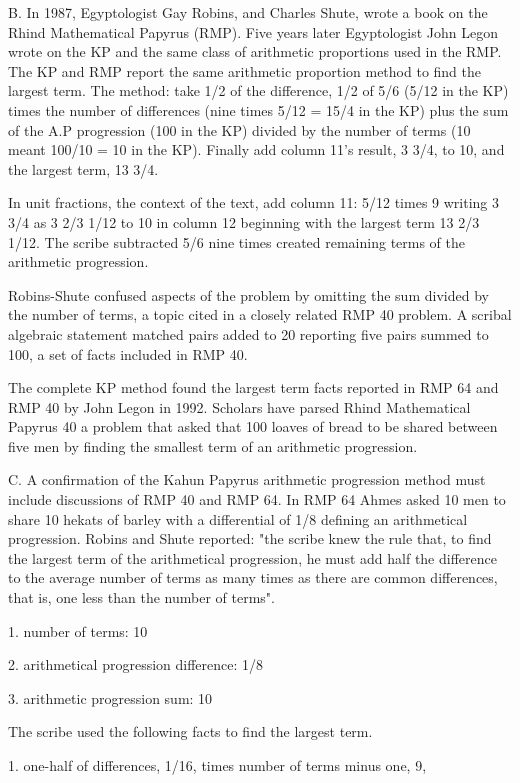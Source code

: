 \documentclass[12pt]{article}
\begin{document}
B. In 1987, Egyptologist Gay Robins, and Charles Shute, wrote a book on the Rhind Mathematical Papyrus (RMP). Five years later Egyptologist John Legon wrote on the KP and the same class of arithmetic proportions used in the RMP. The KP and RMP report the same arithmetic proportion method to find the largest term. The method: take 1/2 of the difference, 1/2 of 5/6 (5/12 in the KP) times the number of differences (nine times 5/12 = 15/4 in the KP) plus the sum of the A.P progression (100 in the KP) divided by the number of terms (10 meant 100/10 = 10 in the KP). Finally add column 11's result, 3 3/4, to 10, and the largest term, 13 3/4.

In unit fractions, the context of the text, add column 11: 5/12 times 9 writing 3 3/4 as 3 2/3 1/12 to 10 in column 12 beginning with the largest term 13 2/3 1/12. The scribe subtracted 5/6 nine times created remaining terms of the arithmetic progression.

Robins-Shute confused aspects of the problem by omitting the sum divided by the number of terms, a topic cited in a closely related RMP 40 problem. A scribal algebraic statement matched pairs added to 20 reporting five pairs summed to 100, a set of facts included in RMP 40.

The complete KP method found the largest term facts reported in RMP 64 and RMP 40 by John Legon in 1992. Scholars have parsed Rhind Mathematical Papyrus 40 a problem that asked that 100 loaves of bread to be shared between five men by finding the smallest term of an arithmetic progression.

C. A confirmation of the Kahun Papyrus arithmetic progression method must include discussions of RMP 40 and RMP 64. In RMP 64 Ahmes asked 10 men to share 10 hekats of barley with a differential of 1/8 defining an arithmetical progression. Robins and Shute reported: "the scribe knew the rule that, to find the largest term of the arithmetical progression, he must add half the difference to the average number of terms as many times as there are common differences, that is, one less than the number of terms".

1. number of terms: 10

2. arithmetical progression difference: 1/8

3. arithmetic progression sum: 10

The scribe used the following facts to find the largest term.

1. one-half of differences, 1/16, times number of terms minus one, 9,
\end{document}

